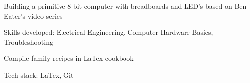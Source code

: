 \documentclass[letterpaper]{resume}
\begin{document}


\begin{compactitem}
\item Building a primitive 8-bit computer with breadboards and LED's based on Ben Eater's video series
\item Skills developed: Electrical Engineering, Computer Hardware Basics, Troubleshooting
\end{compactitem}

\begin{compactitem}
\item Compile family recipes in LaTex cookbook
\item Tech stack: LaTex, Git
\end{compactitem}
\end{document}
